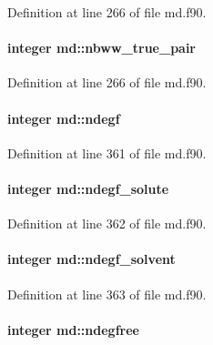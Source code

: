 Definition at line 266 of file md.\-f90.

\hypertarget{classmd_aa0751148c3e030ed0ba6da70b13c204b}{
\paragraph[{nbww\-\_\-true\-\_\-pair}]{\setlength{\rightskip}{0pt plus 5cm}integer md\-::nbww\-\_\-true\-\_\-pair}}\label{classmd_aa0751148c3e030ed0ba6da70b13c204b}


Definition at line 266 of file md.\-f90.

\hypertarget{classmd_ab480769170b2dce48ba44bc149c1cf04}{
\paragraph[{ndegf}]{\setlength{\rightskip}{0pt plus 5cm}integer md\-::ndegf}}\label{classmd_ab480769170b2dce48ba44bc149c1cf04}


Definition at line 361 of file md.\-f90.

\hypertarget{classmd_ad0ab5b60b52d1033a80404e9bb4f5df2}{
\paragraph[{ndegf\-\_\-solute}]{\setlength{\rightskip}{0pt plus 5cm}integer md\-::ndegf\-\_\-solute}}\label{classmd_ad0ab5b60b52d1033a80404e9bb4f5df2}


Definition at line 362 of file md.\-f90.

\hypertarget{classmd_aef031b7b88d94e34601bf6c0dc4eb107}{
\paragraph[{ndegf\-\_\-solvent}]{\setlength{\rightskip}{0pt plus 5cm}integer md\-::ndegf\-\_\-solvent}}\label{classmd_aef031b7b88d94e34601bf6c0dc4eb107}


Definition at line 363 of file md.\-f90.

\hypertarget{classmd_a056512c883c3b1ed939e5171030d9873}{
\paragraph[{ndegfree}]{\setlength{\rightskip}{0pt plus 5cm}integer md\-::ndegfree}}\label{classmd_a056512c883c3b1ed939e5171030d9873}


